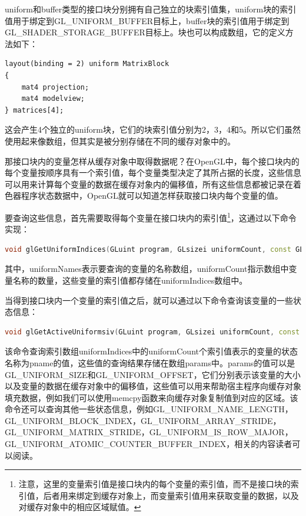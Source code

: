 uniform和buffer类型的接口块分别拥有自己独立的块索引值集，uniform块的索引值用于绑定到GL\_UNIFORM\_BUFFER目标上，buffer块的索引值用于绑定到GL\_SHADER\_STORAGE\_BUFFER目标上。块也可以构成数组，它的定义方法如下：

\begin{lstlisting}
layout(binding = 2) uniform MatrixBlock
{
	mat4 projection;
	mat4 modelview;
} matrices[4];
\end{lstlisting}

这会产生4个独立的uniform块，它们的块索引值分别为2，3，4和5。所以它们虽然使用起来像数组，但其实是被分别存储在不同的缓存对象中的。

那接口块内的变量怎样从缓存对象中取得数据呢？在OpenGL中，每个接口块内的每个变量按顺序具有一个索引值，每个变量类型决定了其所占据的长度，这些信息可以用来计算每个变量的数据在缓存对象内的偏移值，所有这些信息都被记录在着色器程序状态数据中，OpenGL就可以知道怎样获取接口块内每个变量的值。

要查询这些信息，首先需要取得每个变量在接口块内的索引值\footnote{注意，这里的变量索引值是接口块内的每个变量的索引值，而不是接口块的索引值，后者用来绑定到缓存对象上，而变量索引值用来获取变量的数据，以及对缓存对象中的相应区域赋值。}，这通过以下命令实现：

\begin{lstlisting}[language=C++]
void glGetUniformIndices(GLuint program​, GLsizei uniformCount​, const GLchar **uniformNames​, GLuint *uniformIndices​);
\end{lstlisting}

其中，uniformNames表示要查询的变量的名称数组，uniformCount指示数组中变量名称的数量，这些变量的索引值都存储在uniformIndices数组中。

当得到接口块内一个变量的索引值之后，就可以通过以下命令查询该变量的一些状态信息：

\begin{lstlisting}[language=C++]
void glGetActiveUniformsiv(GLuint program​, GLsizei uniformCount​, const GLuint *uniformIndices​, GLenum pname​, GLint *params​);
\end{lstlisting}

该命令查询索引数组uniformIndices中的uniformCount个索引值表示的变量的状态名称为pname的值，这些值的查询结果存储在数组params中。params的值可以是GL\_UNIFORM\_SIZE和GL\_UNIFORM\_OFFSET，它们分别表示该变量的大小以及变量的数据在缓存对象中的偏移值，这些值可以用来帮助宿主程序向缓存对象填充数据，例如我们可以使用memcpy函数来向缓存对象复制值到对应的区域。该命令还可以查询其他一些状态信息，例如GL\_UNIFORM\_NAME\_LENGTH，GL\_UNIFORM\_BLOCK\_INDEX，GL\_UNIFORM\_ARRAY\_STRIDE，GL\_UNIFORM\_MATRIX\_STRIDE，GL\_UNIFORM\_IS\_ROW\_MAJOR，GL\_UNIFORM\_ATOMIC\_COUNTER\_BUFFER\_INDEX，相关的内容读者可以阅读\cite{b:OpenGL4.5CoreProfile}。

